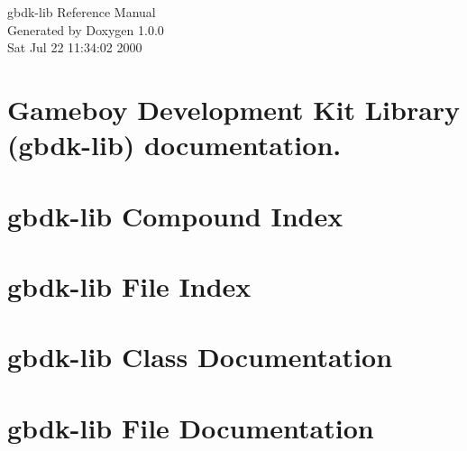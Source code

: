 \documentclass[a4paper]{book}
\begin{document}
\begin{titlepage}
\vspace*{7cm}
\begin{center}
{\Large gbdk-lib Reference Manual}\\
\vspace*{1cm}
{\large Generated by Doxygen 1.0.0}\\
\vspace*{0.5cm}
{\small Sat Jul 22 11:34:02 2000}\\
\end{center}
\end{titlepage}
\clearemptydoublepage
{}
\tableofcontents
\clearemptydoublepage
{}
\chapter{Gameboy Development Kit Library (gbdk-lib) documentation.}

\chapter{gbdk-lib Compound Index}

\chapter{gbdk-lib File Index}

\chapter{gbdk-lib Class Documentation}

\chapter{gbdk-lib File Documentation}
















\printindex
\end{document}
